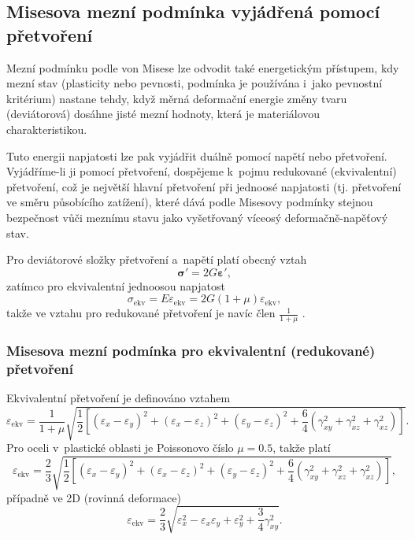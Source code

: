 
\subsection{Misesova mezní podmínka vyjádřená pomocí přetvoření}
Mezní podmínku podle von Misese lze odvodit také energetickým přístupem, kdy mezní stav (plasticity nebo pevnosti, podmínka je používána i~jako pevnostní kritérium) nastane tehdy, když měrná deformační energie změny tvaru (deviátorová) dosáhne jisté mezní hodnoty, která je materiálovou charakteristikou.

Tuto energii napjatosti lze pak vyjádřit duálně pomocí napětí nebo přetvoření.
Vyjádříme-li ji pomocí přetvoření, dospějeme k~pojmu redukované (ekvivalentní) přetvoření, což je největší hlavní přetvoření při jednoosé napjatosti (tj. přetvoření ve směru působícího zatížení), které dává podle Misesovy podmínky stejnou bezpečnost vůči meznímu stavu jako vyšetřovaný víceosý deformačně-napěťový stav. 

Pro deviátorové složky přetvoření a~napětí platí obecný vztah
\begin{equation}
	\bm{\sigma}' = 2 G \bm{\varepsilon}',
\end{equation}
zatímco pro ekvivalentní jednoosou napjatost
\begin{equation}
	\sigma_\text{ekv} = E \varepsilon_\text{ekv} = 2 G (1+\mu) \varepsilon_\text{ekv},
\end{equation}
takže ve vztahu pro redukované přetvoření je navíc člen $\frac{1}{1+\mu}$ .

\subsubsection{Misesova mezní podmínka pro ekvivalentní (redukované) přetvoření}
Ekvivalentní přetvoření je definováno vztahem
\begin{equation}
	\varepsilon_\text{ekv} = \frac{1}{1+\mu} \sqrt{\frac{1}{2} \left[ (\varepsilon_x-\varepsilon_y)^2 + (\varepsilon_x-\varepsilon_z)^2 + (\varepsilon_y-\varepsilon_z)^2 + \frac{6}{4} \left( \gamma_{xy}^2 + \gamma_{xz}^2 + \gamma_{xz}^2 \right) \right]}.
\end{equation}
Pro oceli v~plastické oblasti je Poissonovo číslo $\mu=\num{0.5}$, takže platí
\begin{equation}
	\varepsilon_\text{ekv} = \frac{2}{3} \sqrt{\frac{1}{2} \left[ (\varepsilon_x-\varepsilon_y)^2 + (\varepsilon_x-\varepsilon_z)^2 + (\varepsilon_y-\varepsilon_z)^2 + \frac{6}{4} \left( \gamma_{xy}^2 + \gamma_{xz}^2 + \gamma_{xz}^2 \right) \right]},
\end{equation}
případně ve 2D (rovinná deformace)
\begin{equation}
	\varepsilon_\text{ekv} = \frac{2}{3} \sqrt{ \varepsilon_x^2 - \varepsilon_x\varepsilon_y + \varepsilon_y^2 + \frac{3}{4} \gamma_{xy}^2 }.
\end{equation}

